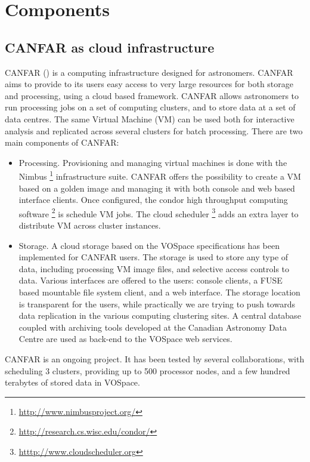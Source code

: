 \documentclass[11pt,twoside]{article}
\begin{document}
\section{Components}
\subsection{CANFAR as cloud infrastructure}
CANFAR (\cite{canfar}) is a computing infrastructure designed for
astronomers. CANFAR aims to provide to its users easy access to very
large resources for both storage and processing, using a cloud based
framework. CANFAR allows astronomers to run processing jobs on a set
of computing clusters, and to store data at a set of data centres. The
same Virtual Machine (VM) can be used both for interactive analysis
and replicated across several clusters for batch processing.
There are two main components of CANFAR:
\begin{itemize}
\item Processing. Provisioning and managing virtual machines is done
  with the Nimbus \footnote{\url{http://www.nimbusproject.org/}}
  infrastructure suite. CANFAR offers the possibility
  to create a VM based on a golden image and managing it with both
  console and web based interface clients. Once configured,
  the condor high throughput computing software \footnote{\url{http://research.cs.wisc.edu/condor/}} is
  schedule VM jobs. The cloud scheduler \footnote{\url{htttp://www.cloudscheduler.org}} adds
  an extra layer to distribute VM across cluster instances.
\item Storage. A cloud storage based on the VOSpace specifications has
  been implemented for CANFAR users. The storage is used to store any
  type of data, including processing VM image files, and selective
  access controls to data. Various interfaces are offered to the
  users: console clients, a FUSE based mountable file system client,
  and a web interface. The storage location is transparent for
  the users, while practically we are trying to push towards data
  replication in the various computing clustering sites. A central
  database coupled with archiving tools developed at the Canadian
  Astronomy Data Centre are used as back-end to the VOSpace web services.
\end{itemize}

\indent CANFAR is an ongoing project. It has been tested by several
collaborations, with scheduling 3 clusters, providing up to 500
processor nodes, and a few hundred terabytes of stored data in
VOSpace.
\end{document}
